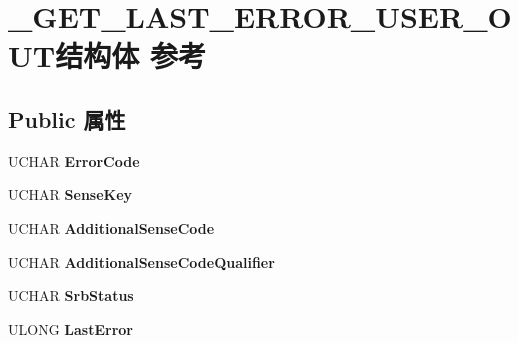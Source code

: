 \hypertarget{struct___g_e_t___l_a_s_t___e_r_r_o_r___u_s_e_r___o_u_t}{}\section{\+\_\+\+G\+E\+T\+\_\+\+L\+A\+S\+T\+\_\+\+E\+R\+R\+O\+R\+\_\+\+U\+S\+E\+R\+\_\+\+O\+U\+T结构体 参考}
\label{struct___g_e_t___l_a_s_t___e_r_r_o_r___u_s_e_r___o_u_t}
\subsection*{Public 属性}
\begin{DoxyCompactItemize}
\item 
\mbox{\label{struct___g_e_t___l_a_s_t___e_r_r_o_r___u_s_e_r___o_u_t_ad26d627c10aebb30ca4223ccaf095577}} 
U\+C\+H\+AR {\bfseries Error\+Code}
\item 
\mbox{\label{struct___g_e_t___l_a_s_t___e_r_r_o_r___u_s_e_r___o_u_t_a9e67c43bb0afc4e93c122cabfd253947}} 
U\+C\+H\+AR {\bfseries Sense\+Key}
\item 
\mbox{\label{struct___g_e_t___l_a_s_t___e_r_r_o_r___u_s_e_r___o_u_t_af54777dca177d806f3dc7dace9e0e76b}} 
U\+C\+H\+AR {\bfseries Additional\+Sense\+Code}
\item 
\mbox{\label{struct___g_e_t___l_a_s_t___e_r_r_o_r___u_s_e_r___o_u_t_a84ce5d0599ef52c5c68d050fd23d9b8d}} 
U\+C\+H\+AR {\bfseries Additional\+Sense\+Code\+Qualifier}
\item 
\mbox{\label{struct___g_e_t___l_a_s_t___e_r_r_o_r___u_s_e_r___o_u_t_aa3476f11af8a8743a99b42c997310096}} 
U\+C\+H\+AR {\bfseries Srb\+Status}
\item 
\mbox{\label{struct___g_e_t___l_a_s_t___e_r_r_o_r___u_s_e_r___o_u_t_a869f14958410f4abbf4b7620d39746e4}} 
U\+L\+O\+NG {\bfseries Last\+Error}

\end{DoxyCompactItemize}
